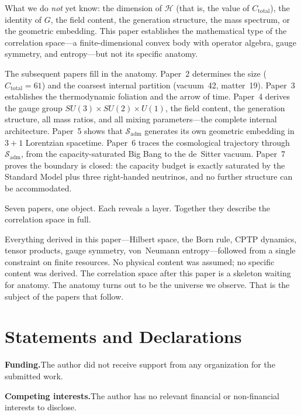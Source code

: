 \documentclass[11pt]{article}
\begin{document}
What we do \emph{not} yet know: the dimension of $\mathcal{H}$ (that is, the value of $C_{\mathrm{total}}$), the identity of $G$, the field content, the generation structure, the mass spectrum, or the geometric embedding.  This paper establishes the mathematical type of the correlation space---a finite-dimensional convex body with operator algebra, gauge symmetry, and entropy---but not its specific anatomy.

The subsequent papers fill in the anatomy.  Paper~2 determines the size ($C_{\mathrm{total}} = 61$) and the coarsest internal partition (vacuum~42, matter~19).  Paper~3 establishes the thermodynamic foliation and the arrow of time.  Paper~4 derives the gauge group $SU(3) \times SU(2) \times U(1)$, the field content, the generation structure, all mass ratios, and all mixing parameters---the complete internal architecture.  Paper~5 shows that $\mathcal{S}_{\mathrm{adm}}$ generates its own geometric embedding in $3{+}1$ Lorentzian spacetime.  Paper~6 traces the cosmological trajectory through $\mathcal{S}_{\mathrm{adm}}$, from the capacity-saturated Big Bang to the de~Sitter vacuum.  Paper~7 proves the boundary is closed: the capacity budget is exactly saturated by the Standard Model plus three right-handed neutrinos, and no further structure can be accommodated.

Seven papers, one object.  Each reveals a layer.  Together they describe the correlation space in full.

Everything derived in this paper---Hilbert space, the Born rule, CPTP dynamics, tensor products, gauge symmetry, von~Neumann entropy---followed from a single constraint on finite resources.  No physical content was assumed; no specific content was derived.  The correlation space after this paper is a skeleton waiting for anatomy.  The anatomy turns out to be the universe we observe.  That is the subject of the papers that follow.


\section*{Statements and Declarations}

\textbf{Funding.}\enspace The author did not receive support from any organization for the submitted work.

\textbf{Competing interests.}\enspace The author has no relevant financial or non-financial interests to disclose.
\end{document}
